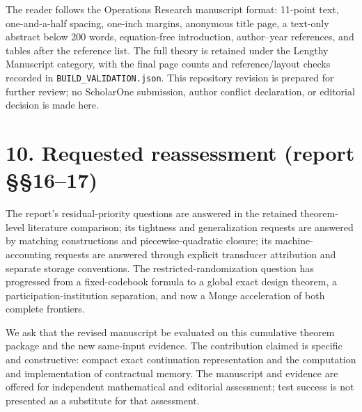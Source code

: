 \documentclass[11pt,letterpaper]{article}
\begin{document}
The reader follows the Operations Research manuscript format: 11-point text, one-and-a-half spacing, one-inch margins, anonymous title page, a text-only abstract below 200 words, equation-free introduction, author--year references, and tables after the reference list. The full theory is retained under the Lengthy Manuscript category, with the final page counts and reference/layout checks recorded in \nolinkurl{BUILD_VALIDATION.json}. This repository revision is prepared for further review; no ScholarOne submission, author conflict declaration, or editorial decision is made here.


\section*{10. Requested reassessment (report §§16--17)}

The report's residual-priority questions are answered in the retained theorem-level literature comparison; its tightness and generalization requests are answered by matching constructions and piecewise-quadratic closure; its machine-accounting requests are answered through explicit transducer attribution and separate storage conventions. The restricted-randomization question has progressed from a fixed-codebook formula to a global exact design theorem, a participation-institution separation, and now a Monge acceleration of both complete frontiers.


We ask that the revised manuscript be evaluated on this cumulative theorem package and the new same-input evidence. The contribution claimed is specific and constructive: compact exact continuation representation and the computation and implementation of contractual memory. The manuscript and evidence are offered for independent mathematical and editorial assessment; test success is not presented as a substitute for that assessment.\par 
\end{document}
